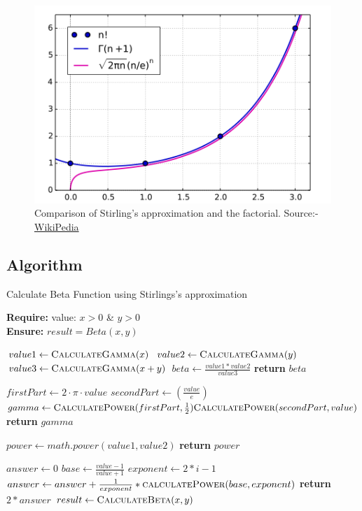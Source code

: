 \documentclass[12pt,a4paper]{report}
\begin{document}
\begin{figure}[h]
    \centering
    \begin{center}
    \includegraphics[width=0.39\linewidth]{Images/Mplwp_factorial_gamma_stirling.svg.png}    
    \end{center}
    \caption{Comparison of Stirling's approximation and the factorial. Source:-  \href{https://en.wikipedia.org/wiki/Stirling\%27s\_approximation}{WikiPedia}}
    \label{fig:OSI Layers Model.}
\end{figure}

\newpage
\subsection{Algorithm}

\begin{algorithm}
\caption{Calculate Beta Function using Stirlings's approximation}

\textbf{Require:}  value: $x > 0$ \& $y>0$  \\
\textbf{Ensure:} $result = Beta(x,y)$
\begin{algorithmic}[1]

    \State $value1 \leftarrow \Call{CalculateGamma}{x}$
    \State $value2 \leftarrow \Call{CalculateGamma}{y}$
    \State $value3 \leftarrow \Call{CalculateGamma}{x+y}$
    \State $beta \leftarrow \frac{value1 * value2}{value3}$
    \State \textbf{return} $beta$
    \EndProcedure
\Statex

    \State $firstPart \leftarrow 2 \cdot \pi \cdot value$
    \State $secondPart \leftarrow (\frac{value}{e})$
    \State $gamma \leftarrow \Call{CalculatePower}{firstPart,\frac{1}{2}} \Call{CalculatePower}{secondPart,value}$
    \State \textbf{return} $gamma$
    \EndProcedure
\Statex

    \State $power \leftarrow math.power(value1,value2)$
    \State \textbf{return} $power$
    \EndProcedure
\Statex

    \State $answer \leftarrow 0$
    \State $base \leftarrow \frac{value-1}{value+1}$
    \State $exponent \leftarrow 2 * i - 1$
    \State $answer \leftarrow answer + \frac{1}{exponent}*\Call{calculatePower}{base,exponent}$
    \EndFor
    \State \textbf{return} $2*answer$ 
    \EndProcedure
\Statex
\State $result \leftarrow \Call{CalculateBeta}{x,y} $

\end{algorithmic}
\end{algorithm}
\end{document}
